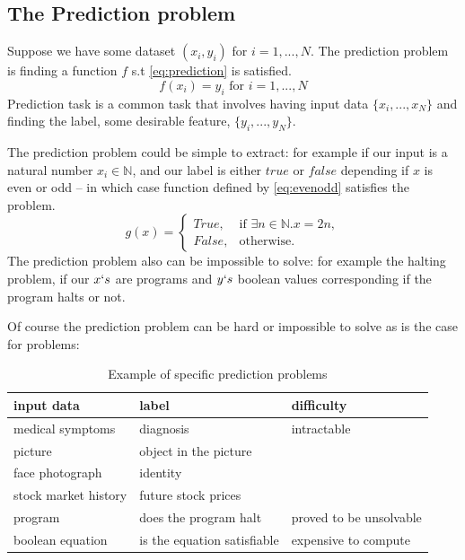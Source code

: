 \documentclass[dissertation.tex]{subfiles}
\begin{document}
\subsection{The Prediction problem} 

Suppose we have some dataset $(x_i, y_i)$ for $i = 1,...,N$. The prediction
problem is finding a function $f$ s.t \autoref{eq:prediction} is satisfied.
\begin{equation}
  f(x_i) = y_i \text{ for } i = 1,...,N
  \label{eq:prediction}
\end{equation}
Prediction task is a common task that involves having input data
$\{x_i,...,x_N\}$ and finding the label, some desirable feature,
$\{y_i,...,y_N\}$. 

The prediction problem could be simple to extract: for example if our input is a
natural number $x_i\in\mathbb{N}$, and our label is either $true$ or $false$
depending if $x$ is even or odd -- in which case function defined by
\autoref{eq:evenodd} satisfies the problem.  \begin{equation}
  g(x) = \begin{cases}
    True, & \text{if } \exists n\in\mathbb{N}.x = 2n , \\
    False, & \text{otherwise}.
  \end{cases}
\label{eq:evenodd}
\end{equation}
The prediction problem also can be impossible to solve: for example the halting
problem, if our $x`s$ are programs and $y`s$ boolean values corresponding if the
program halts or not.


Of course the prediction problem can be hard or impossible to solve as is the
case for problems:
\begin{table}[H]
  \centering
    \begin{tabular}{l|l|l}
      input data & label & difficulty \\ 
      \hline
      \rowcolor{Gray}
      medical symptoms & diagnosis & intractable \\ 
      picture  & object in the picture &  \\ 
      \rowcolor{Gray}
      face photograph  & identity &  \\ 
      stock market history  & future stock prices &  \\ 
      \rowcolor{Gray}
      program  & does the program halt & proved to be unsolvable \\ 
      boolean equation  & is the equation satisfiable & expensive to compute 
  \end{tabular}
  \caption{Example of specific prediction problems }
  \label{t:prediction}
\end{table}
\end{document}
